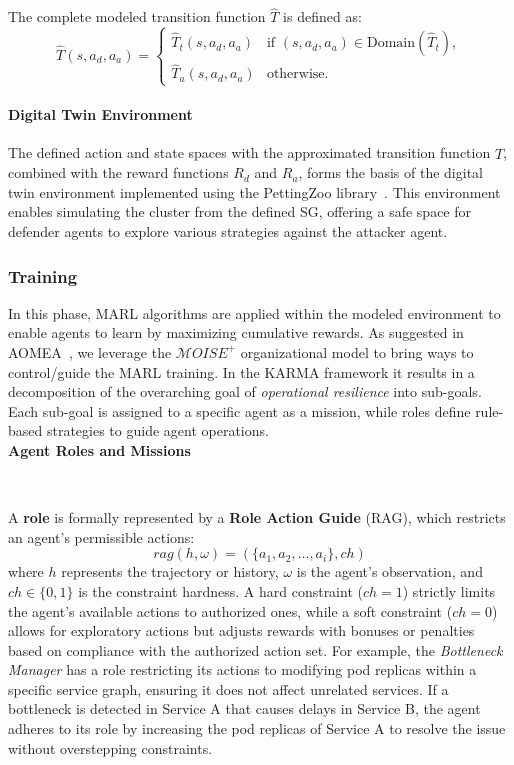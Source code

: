 The complete modeled transition function $\hat{T}$ is defined as:
$$
\hat{T}(s, a_d, a_a) = 
\begin{cases} 
\hat{T}_t(s, a_d, a_a) & \text{if } (s, a_d, a_a) \in \text{Domain}(\hat{T}_t), \\
\hat{T}_a(s, a_d, a_a) & \text{otherwise}.
\end{cases}
$$

\noindent \paragraph{\textbf{Digital Twin Environment}} The defined action and state spaces with the approximated transition function $\hat{T}$, combined with the reward functions $R_d$ and $R_a$, forms the basis of the digital twin environment implemented using the PettingZoo library~\cite{Terry2021}. This environment enables simulating the cluster from the defined SG, offering a safe space for defender agents to explore various strategies against the attacker agent.



\subsubsection{Training}
\label{sec:training}

In this phase, MARL algorithms are applied within the modeled environment to enable agents to learn by maximizing cumulative rewards. As suggested in AOMEA~\cite{soule2024aomea}, we leverage the $\mathcal{M}OISE^+$ organizational model to bring ways to control/guide the MARL training. In the KARMA framework it results in a decomposition of the overarching goal of \textit{operational resilience} into sub-goals. Each sub-goal is assigned to a specific agent as a mission, while roles define rule-based strategies to guide agent operations.\\

\noindent \textbf{Agent Roles and Missions}

\

A \textbf{role} is formally represented by a \textbf{Role Action Guide} (RAG), which restricts an agent's permissible actions:
$$
rag(h, \omega) = (\{a_1, a_2, \dots, a_i\}, ch)
$$
where $h$ represents the trajectory or history, \(\omega\) is the agent's observation, and \(ch \in \{0,1\}\) is the constraint hardness. A hard constraint (\(ch = 1\)) strictly limits the agent's available actions to authorized ones, while a soft constraint (\(ch = 0\)) allows for exploratory actions but adjusts rewards with bonuses or penalties based on compliance with the authorized action set. For example, the \textit{Bottleneck Manager} has a role restricting its actions to modifying pod replicas within a specific service graph, ensuring it does not affect unrelated services. If a bottleneck is detected in Service A that causes delays in Service B, the agent adheres to its role by increasing the pod replicas of Service A to resolve the issue without overstepping constraints.

